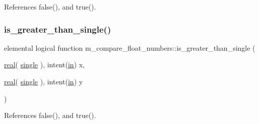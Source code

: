 References false(), and true().

\mbox{\label{namespacem__compare__float__numbers_ab525ef9c044e5187643e04c64d470186}} 
\subsubsection{\texorpdfstring{is\+\_\+greater\+\_\+than\+\_\+single()}{is\_greater\_than\_single()}}
{\footnotesize\ttfamily elemental logical function m\+\_\+compare\+\_\+float\+\_\+numbers\+::is\+\_\+greater\+\_\+than\+\_\+single (\begin{DoxyParamCaption}\item[{\hyperlink{read__watch_83_8txt_abdb62bde002f38ef75f810d3a905a823}{real}( \hyperlink{namespacem__compare__float__numbers_a5f122d46d6ad7d1cf0b899d9c855c498}{single} ), intent(\hyperlink{M__journal_83_8txt_afce72651d1eed785a2132bee863b2f38}{in})}]{x,  }\item[{\hyperlink{read__watch_83_8txt_abdb62bde002f38ef75f810d3a905a823}{real}( \hyperlink{namespacem__compare__float__numbers_a5f122d46d6ad7d1cf0b899d9c855c498}{single} ), intent(\hyperlink{M__journal_83_8txt_afce72651d1eed785a2132bee863b2f38}{in})}]{y }\end{DoxyParamCaption})\hspace{0.3cm}{\ttfamily [private]}}



References false(), and true().

\mbox{\label{namespacem__compare__float__numbers_a36578a1fa0cf4ee3d29ded529dbd156c}} 
